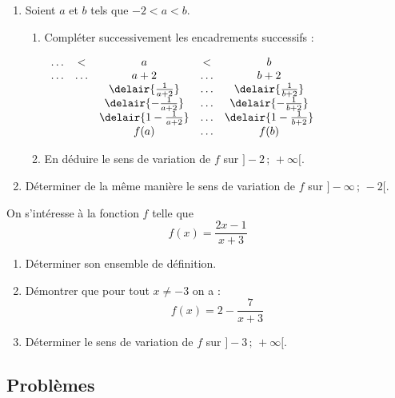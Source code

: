 \begin{multicols}{2}
\begin{exo}
\begin{enumerate}
 \item Soient $a$ et $b$ tels que $-2<a<b$.
	\begin{enumerate}
	 \item Compl\'eter successivement les encadrements successifs :
	\begin{center}
	  $\begin{array}{ccccc}
	  \ldots & < & a & <  & b \\
	  \ldots & \ldots & a+2 & \ldots  & b+2 \\
	   &  & \delair{\frac{1}{a+2}} & \ldots  & \delair{\frac{1}{b+2}} \\
	   &  & \delair{-\frac{1}{a+2}} & \ldots  & \delair{-\frac{1}{b+2}} \\
	   &  & \delair{1-\frac{1}{a+2}} & \ldots  & \delair{1-\frac{1}{b+2}} \\
	   &  & f(a) & \ldots  & f(b) \\
	  \end{array}$	             \end{center}
	 \item En d\'eduire le sens de variation de $f$ sur $]-2\,;\,+\infty[$.
	\end{enumerate}
 \item D\'eterminer de la m\^eme mani\`ere le sens de variation de $f$ sur $]-\infty\,;\,-2[$.
\end{enumerate}
\end{exo}




\begin{exo}
On s'int\'eresse \`a la fonction $f$ telle que \[f(x)=\frac{2x-1}{x+3}\]
\begin{enumerate}
 \item D\'eterminer son ensemble de d\'efinition.
 \item D\'emontrer que pour tout $x\neq-3$ on a : \[f(x)=2-\frac{7}{x+3}\]

 \item D\'eterminer le sens de variation de $f$ sur $]-3\,;\,+\infty[$.
\end{enumerate}
\end{exo}

\end{multicols}

\subsection{Probl\`emes}

